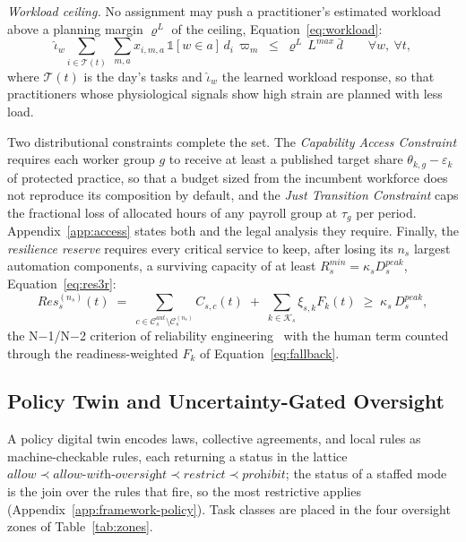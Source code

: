 \documentclass[utf8]{FrontiersinHarvard}
\begin{document}
	\textit{Workload ceiling.} No assignment may push a practitioner's estimated workload above a planning margin $\varrho^{L}$ of the ceiling, Equation~\eqref{eq:workload}:
	\begin{equation}
		\hat\iota_w \sum_{i\in\mathcal{T}(t)}\ \sum_{m,a} x_{i,m,a}\,\mathbb{1}[w\in a]\, d_i\,\varpi_m \;\le\; \varrho^{L}\,L^{max}\,\bar d
		\qquad \forall w,\ \forall t,
		\label{eq:workload}
	\end{equation}
	where $\mathcal{T}(t)$ is the day's tasks and $\hat\iota_w$ the learned workload response, so that practitioners whose physiological signals show high strain are planned with less load.

	Two distributional constraints complete the set. The \textit{Capability Access Constraint} requires each worker group $g$ to receive at least a published target share $\theta_{k,g}-\varepsilon_k$ of protected practice, so that a budget sized from the incumbent workforce does not reproduce its composition by default, and the \textit{Just Transition Constraint} caps the fractional loss of allocated hours of any payroll group at $\tau_g$ per period. Appendix~\ref{app:access} states both and the legal analysis they require. Finally, the \textit{resilience reserve} requires every critical service to keep, after losing its $n_s$ largest automation components, a surviving capacity of at least $R^{min}_s = \kappa_s D^{peak}_s$, Equation~\eqref{eq:res3r}:
	\begin{equation}
		Res^{(n_s)}_s(t) \;=\; \sum_{c\in\mathcal{C}^{aut}_s\setminus\mathcal{C}^{(n_s)}_s} C_{s,c}(t) \;+\; \sum_{k\in\mathcal{K}_s}\xi_{s,k}F_k(t) \;\ge\; \kappa_s\,D^{peak}_s,
		\label{eq:res3r}
	\end{equation}
	the N$-$1/N$-$2 criterion of reliability engineering~\citep{Jain2024,Ouyang2014} with the human term counted through the readiness-weighted $F_k$ of Equation~\eqref{eq:fallback}.

	\subsection{Policy Twin and Uncertainty-Gated Oversight}
	\label{sec:oversight}

	A policy digital twin encodes laws, collective agreements, and local rules as machine-checkable rules, each returning a status in the lattice $\textit{allow}\prec\textit{allow-with-oversight}\prec\textit{restrict}\prec\textit{prohibit}$; the status of a staffed mode is the join over the rules that fire, so the most restrictive applies (Appendix~\ref{app:framework-policy}). Task classes are placed in the four oversight zones of Table~\ref{tab:zones}.
\end{document}
